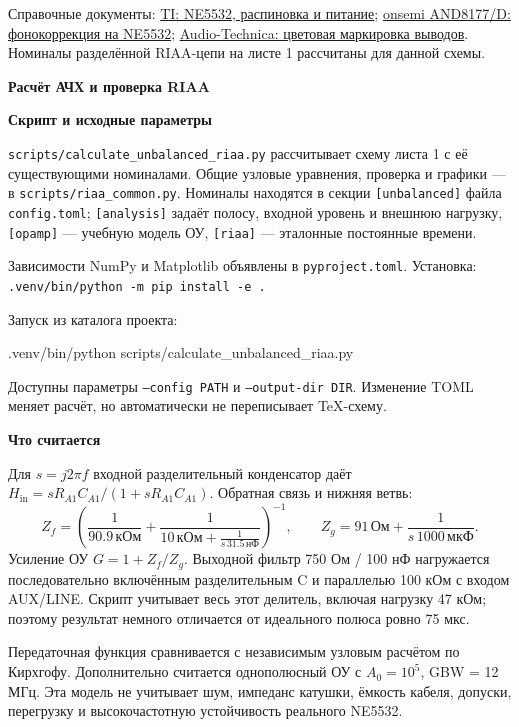 \documentclass[a4paper,landscape,11pt]{article}
\newcommand{\kohm}{\,\text{кОм}}
\newcommand{\ohm}{\,\text{Ом}}
\newcommand{\nf}{\,\text{нФ}}
\newcommand{\uf}{\,\text{мкФ}}
\begin{document}
\vfill
\footnotesize
Справочные документы:
\href{https://www.ti.com/lit/ds/symlink/ne5532.pdf}{TI: NE5532, распиновка и питание};
\href{https://www.onsemi.com/download/application-notes/pdf/and8177-d.pdf}{onsemi AND8177/D: фонокоррекция на NE5532};
\href{https://www.audio-technica.co.jp/pdf/support/AT-VM95C_UM.pdf}{Audio-Technica: цветовая маркировка выводов}.
Номиналы разделённой RIAA-цепи на листе 1 рассчитаны для данной схемы.

\newpage
\normalsize
{\LARGE\bfseries Расчёт АЧХ и проверка RIAA}\par
\vspace{3mm}
\begin{minipage}[t]{0.48\linewidth}
\raggedright
\small
\textbf{Скрипт и исходные параметры}\par
\texttt{scripts/calculate\_unbalanced\_riaa.py} рассчитывает схему листа 1
с её существующими номиналами. Общие узловые уравнения, проверка и графики —
в \texttt{scripts/riaa\_common.py}.
Номиналы находятся в секции \texttt{[unbalanced]} файла \texttt{config.toml};
\texttt{[analysis]} задаёт полосу, входной уровень и внешнюю нагрузку,
\texttt{[opamp]} — учебную модель ОУ, \texttt{[riaa]} — эталонные постоянные времени.
\par\vspace{2mm}
Зависимости NumPy и Matplotlib объявлены в \texttt{pyproject.toml}.
Установка: \texttt{.venv/bin/python -m pip install -e .}\par
Запуск из каталога проекта:\par
{\footnotesize\ttfamily .venv/bin/python scripts/calculate\_unbalanced\_riaa.py}\par
Доступны параметры \texttt{--config PATH} и \texttt{--output-dir DIR}.
Изменение TOML меняет расчёт, но автоматически не переписывает TeX-схему.
\par\vspace{2mm}
\textbf{Что считается}\par
Для $s=j2\pi f$ входной разделительный конденсатор даёт
$H_{\mathrm{in}}=sR_{A1}C_{A1}/(1+sR_{A1}C_{A1})$.
Обратная связь и нижняя ветвь:
\[
 Z_f=\left(\frac1{90.9\kohm}
 +\frac1{10\kohm+\frac1{s\,31.5\nf}}\right)^{-1},\qquad
 Z_g=91\ohm+\frac1{s\,1000\uf}.
\]
Усиление ОУ $G=1+Z_f/Z_g$.
Выходной фильтр 750 Ом / 100 нФ нагружается последовательно включённым
разделительным C и параллелью 100 кОм с входом AUX/LINE.
Скрипт учитывает весь этот делитель, включая нагрузку 47 кОм;
поэтому результат немного отличается от идеального полюса ровно 75 мкс.
\par\vspace{2mm}
Передаточная функция сравнивается с независимым узловым расчётом по Кирхгофу.
Дополнительно считается однополюсный ОУ с $A_0=10^5$, GBW = 12 МГц.
Эта модель не учитывает шум, импеданс катушки, ёмкость кабеля, допуски,
перегрузку и высокочастотную устойчивость реального NE5532.
\end{minipage}\hfill
\end{document}
